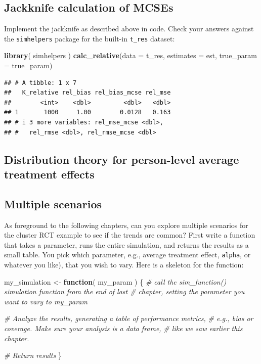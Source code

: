 \documentclass[
]{book}
\newenvironment{Shaded}{\begin{snugshade}}{\end{snugshade}}
\newcommand{\AttributeTok}[1]{\textcolor[rgb]{0.13,0.29,0.53}{#1}}
\newcommand{\CommentTok}[1]{\textcolor[rgb]{0.56,0.35,0.01}{\textit{#1}}}
\newcommand{\ControlFlowTok}[1]{\textcolor[rgb]{0.13,0.29,0.53}{\textbf{#1}}}
\newcommand{\FunctionTok}[1]{\textcolor[rgb]{0.13,0.29,0.53}{\textbf{#1}}}
\newcommand{\NormalTok}[1]{#1}
\newcommand{\OtherTok}[1]{\textcolor[rgb]{0.56,0.35,0.01}{#1}}
\begin{document}
\subsection{Jackknife calculation of MCSEs}\label{jackknife-MCSE}

Implement the jackknife as described above in code. Check your answers against the \texttt{simhelpers} package for the built-in \texttt{t\_res} dataset:

\begin{Shaded}
\begin{Highlighting}[]
\FunctionTok{library}\NormalTok{( simhelpers )}
\FunctionTok{calc\_relative}\NormalTok{(}\AttributeTok{data =}\NormalTok{ t\_res, }\AttributeTok{estimates =}\NormalTok{ est, }\AttributeTok{true\_param =}\NormalTok{ true\_param)}
\end{Highlighting}
\end{Shaded}

\begin{verbatim}
## # A tibble: 1 x 7
##   K_relative rel_bias rel_bias_mcse rel_mse
##        <int>    <dbl>         <dbl>   <dbl>
## 1       1000     1.00        0.0128   0.163
## # i 3 more variables: rel_mse_mcse <dbl>,
## #   rel_rmse <dbl>, rel_rmse_mcse <dbl>
\end{verbatim}

\subsection{Distribution theory for person-level average treatment effects}\label{cluster-RCT-SPATE}

\subsection{Multiple scenarios}\label{multiple-scenario-performance}

As foreground to the following chapters, can you explore multiple scenarios for the cluster RCT example to see if the trends are common? First write a function that takes a parameter, runs the entire simulation, and returns the results as a small table. You pick which parameter, e.g., average treatment effect, \texttt{alpha}, or whatever you like), that you wish to vary. Here is a skeleton for the function:

\begin{Shaded}
\begin{Highlighting}[]
\NormalTok{my\_simulation }\OtherTok{\textless{}{-}} \ControlFlowTok{function}\NormalTok{( my\_param ) \{}
  \CommentTok{\# call the sim\_function() simulation function from the end of last}
  \CommentTok{\# chapter, setting the parameter you want to vary to my\_param}
  
  \CommentTok{\# Analyze the results, generating a table of performance metrics,}
  \CommentTok{\# e.g., bias or coverage. Make sure your analysis is a data frame,}
  \CommentTok{\# like we saw earlier this chapter.}
  
  \CommentTok{\# Return results}
\NormalTok{\}}
\end{Highlighting}
\end{Shaded}
\end{document}
